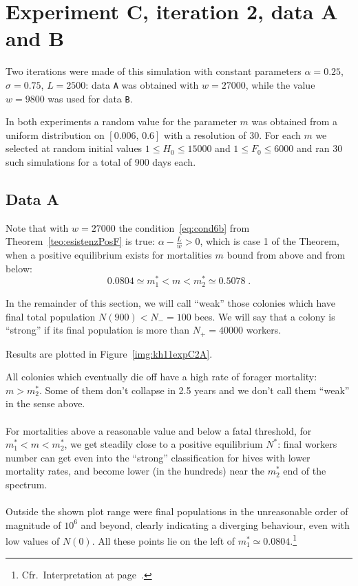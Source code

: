 \section{Experiment C, iteration 2, data A and B}
Two iterations were made of this simulation with constant parameters $\alpha = 0.25$, $\sigma=0.75$, $L=2500$:
data \texttt{A} was obtained with $w=27000$, while the value $w=9800$ was used for data \texttt{B}.

In both experiments a random value for the parameter $m$ was obtained from a uniform distribution on $[0.006, \, 0.6]$
with a resolution of 30. For each $m$ we selected at random initial values $1 \leq H_0 \leq 15000$ and $1 \leq F_0 \leq 6000$ and ran 30 such simulations for a total of 900 days each.

\subsection{Data A}
\label{sec:kh11expC2A}
Note that with $w=27000$ the condition~\eqref{eq:cond6b} from Theorem~\ref{teo:esistenzPosF} is true: $\alpha - \frac{L}{w} > 0$, which is case 1 of the Theorem,
when a positive equilibrium exists for mortalities $m$ bound from above and from below:
$$ 0.0804 \simeq m_1^* < m < m_2^* \simeq 0.5078 \; .$$

In the remainder of this section, we will call ``weak'' those colonies which have final total
population $N(900) < N_- = 100$ bees. We will say that a colony is ``strong'' if
its final population is more than $N_+ = 40000$ workers.

Results are plotted in Figure~\ref{img:kh11expC2A}.

All colonies which eventually die off have a high rate of forager mortality: $m > m_2^*$.
Some of them don't collapse in 2.5 years and we don't call them ``weak'' in the sense above.

\paragraph{}
For mortalities above a reasonable value and below a fatal threshold, \ie for $m_1^* < m < m_2^*$,
we get steadily close to a positive equilibrium $N^*$: final workers number can get even into
the ``strong'' classification for hives with lower mortality rates, and become lower
(in the hundreds) near the $m_2^*$ end of the spectrum.

\paragraph{}
Outside the shown plot range were final populations in the unreasonable order of
magnitude of $10^6$ and beyond, clearly indicating a diverging behaviour, even with low values of $N(0)$.
All these points lie on the left of $m_1^* \simeq 0.0804$.\footnote{Cfr.~Interpretation at page~\pageref{par:interpretationCond6b}.}

